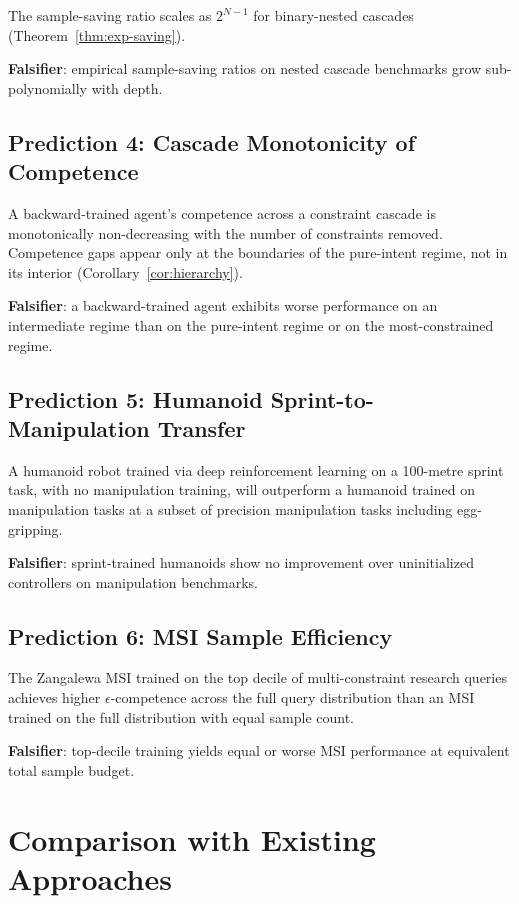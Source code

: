 \documentclass[11pt,twocolumn,a4paper]{article}
\begin{document}
The sample-saving ratio scales as $2^{N-1}$ for binary-nested cascades (Theorem~\ref{thm:exp-saving}).

\textbf{Falsifier}: empirical sample-saving ratios on nested cascade benchmarks grow sub-polynomially with depth.

\subsection{Prediction 4: Cascade Monotonicity of Competence}

A backward-trained agent's competence across a constraint cascade is monotonically non-decreasing with the number of constraints removed. Competence gaps appear only at the boundaries of the pure-intent regime, not in its interior (Corollary~\ref{cor:hierarchy}).

\textbf{Falsifier}: a backward-trained agent exhibits worse performance on an intermediate regime than on the pure-intent regime or on the most-constrained regime.

\subsection{Prediction 5: Humanoid Sprint-to-Manipulation Transfer}

A humanoid robot trained via deep reinforcement learning on a 100-metre sprint task, with no manipulation training, will outperform a humanoid trained on manipulation tasks at a subset of precision manipulation tasks including egg-gripping.

\textbf{Falsifier}: sprint-trained humanoids show no improvement over uninitialized controllers on manipulation benchmarks.

\subsection{Prediction 6: MSI Sample Efficiency}

The Zangalewa MSI trained on the top decile of multi-constraint research queries achieves higher $\epsilon$-competence across the full query distribution than an MSI trained on the full distribution with equal sample count.

\textbf{Falsifier}: top-decile training yields equal or worse MSI performance at equivalent total sample budget.


\section{Comparison with Existing Approaches}
\label{sec:comparison}
\end{document}
